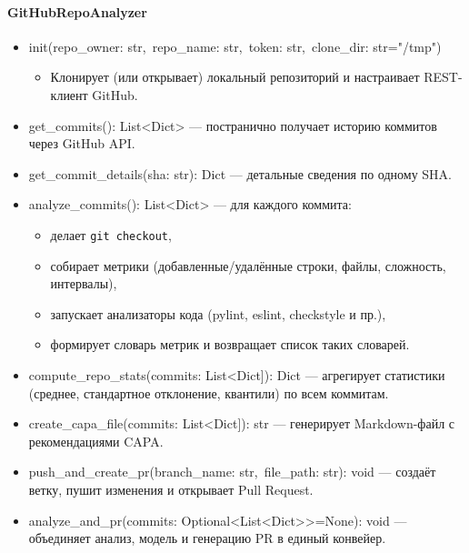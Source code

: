 \paragraph{GitHubRepoAnalyzer}
\begin{itemize}
	\item { init(repo\_owner: str,\ repo\_name: str,\ token: str,\ clone\_dir: str="/tmp")}
	\begin{itemize}
		\item Клонирует (или открывает) локальный репозиторий и настраивает REST-клиент GitHub.
	\end{itemize}
	\item { get\_commits(): List<Dict>} — постранично получает историю коммитов через GitHub API.
	\item { get\_commit\_details(sha: str): Dict} — детальные сведения по одному SHA.
	\item { analyze\_commits(): List<Dict>} — для каждого коммита:
	\begin{itemize}
		\item делает \texttt{git checkout},
		\item собирает метрики (добавленные/удалённые строки, файлы, сложность, интервалы),
		\item запускает анализаторы кода (pylint, eslint, checkstyle и пр.),
		\item формирует словарь метрик и возвращает список таких словарей.
	\end{itemize}
	\item { compute\_repo\_stats(commits: List<Dict]): Dict} — агрегирует статистики (среднее, стандартное отклонение, квантили) по всем коммитам.
	\item { create\_capa\_file(commits: List<Dict]): str} — генерирует Markdown-файл с рекомендациями CAPA.
	\item { push\_and\_create\_pr(branch\_name: str,\ file\_path: str): void} — создаёт ветку, пушит изменения и открывает Pull Request.
	\item { analyze\_and\_pr(commits: Optional<List<Dict>>=None): void} — объединяет анализ, модель и генерацию PR в единый конвейер.
\end{itemize}

